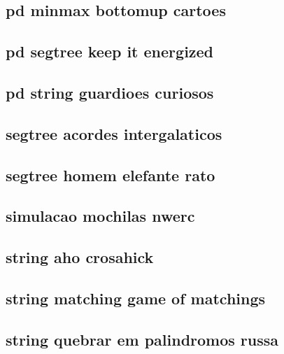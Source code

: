 \subsection{pd minmax bottomup cartoes}
\raggedbottom
\clearpage
\subsection{pd segtree keep it energized}
\raggedbottom
\clearpage
\subsection{pd string guardioes curiosos}
\raggedbottom
\clearpage
\subsection{segtree acordes intergalaticos}
\raggedbottom
\clearpage
\subsection{segtree homem elefante rato}
\raggedbottom
\clearpage
\subsection{simulacao mochilas nwerc}
\raggedbottom
\clearpage
\subsection{string aho crosahick}
\raggedbottom
\clearpage
\subsection{string matching game of matchings}
\raggedbottom
\clearpage
\subsection{string quebrar em palindromos russa}
\raggedbottom
\clearpage
